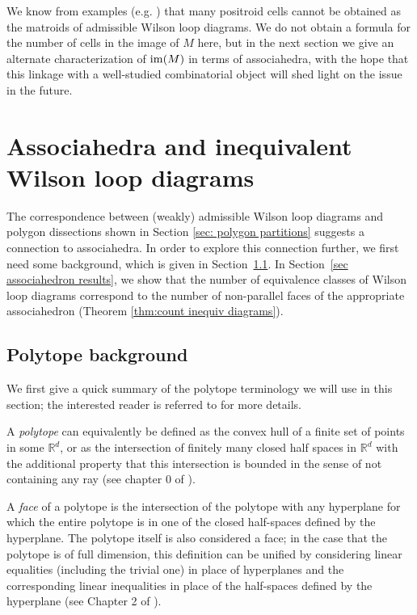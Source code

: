 \documentclass[11pt]{article}
\theoremstyle{remark}
\theoremstyle{definition}
\begin{document}
We know from examples (e.g. \cite{casestudy}) that many positroid cells cannot be obtained as the matroids of admissible Wilson loop diagrams. We do not obtain a formula for the number of cells in the image of $M$ here, but in the next section we give an alternate characterization of ${\rm im}(M)$ in terms of associahedra, with the hope that this linkage with a well-studied combinatorial object will shed light on the issue in the future.

\section{Associahedra and inequivalent Wilson loop diagrams}\label{sec associahedron}

The correspondence between (weakly) admissible Wilson loop diagrams and polygon dissections shown in Section \ref{sec: polygon partitions} suggests a connection to associahedra. In order to explore this connection further, we first need some background, which is given in Section~\ref{sec polytope background}. In Section~\ref{sec associahedron results}, we show that the number of equivalence classes of Wilson loop diagrams correspond to the number of non-parallel faces of the appropriate associahedron (Theorem \ref{thm:count inequiv diagrams}). 

\subsection{Polytope background}\label{sec polytope background}

We first give a quick summary of the polytope terminology we will use in this section; the interested reader is referred to \cite{Ziegler} for more details.

A \emph{polytope} can equivalently be defined as the convex hull of a finite set of points in some $\mathbb{R}^d$, or as the intersection of finitely many closed half spaces in $\mathbb{R}^d$ with the additional property that this intersection is bounded in the sense of not containing any ray (see chapter 0 of \cite{Ziegler}).

A \emph{face} of a polytope is the intersection of the polytope with any hyperplane for which the entire polytope is in one of the closed half-spaces defined by the hyperplane.  The polytope itself is also considered a face; in the case that the polytope is of full dimension, this definition can be unified by considering linear equalities (including the trivial one) in place of hyperplanes and the corresponding linear inequalities in place of the half-spaces defined by the hyperplane (see Chapter 2 of \cite{Ziegler}).  
\end{document}
